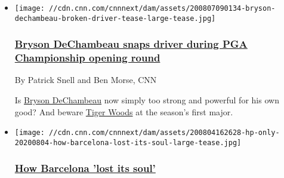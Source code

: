 \begin{itemize}
\item
  \href{/2020/08/07/golf/pga-championship-first-round-recap-bryson-dechambeau-spt-intl/index.html}{}

  \texttt{[image: //cdn.cnn.com/cnnnext/dam/assets/200807090134-bryson-dechambeau-broken-driver-tease-large-tease.jpg]}

  \hypertarget{bryson-dechambeau-snaps-driver-during-pga-championship-opening-round--1}{%
  \subsubsection{\texorpdfstring{\href{/2020/08/07/golf/pga-championship-first-round-recap-bryson-dechambeau-spt-intl/index.html}{Bryson
  DeChambeau snaps driver during PGA Championship opening round
  }}{Bryson DeChambeau snaps driver during PGA Championship opening round }}\label{bryson-dechambeau-snaps-driver-during-pga-championship-opening-round--1}}

  By Patrick Snell and Ben Morse, CNN

  Is
  \href{https://edition.cnn.com/2020/08/06/golf/bryson-dechambeau-calorie-trainer-bulking-muscle-golf-spt-intl/index.html}{Bryson
  DeChambeau} now simply too strong and powerful for his own good? And
  beware
  \href{https://edition.cnn.com/2020/08/05/golf/tiger-woods-pga-championship-golf-spt-intl/index.html}{Tiger
  Woods} at the season's first major.
\end{itemize}

\begin{itemize}
\item
  \href{/2020/08/07/football/barcelona-napoli-champions-league-lionel-messi-spt-intl-cmd/index.html}{}

  \texttt{[image: //cdn.cnn.com/cnnnext/dam/assets/200804162628-hp-only-20200804-how-barcelona-lost-its-soul-large-tease.jpg]}

  \hypertarget{how-barcelona-lost-its-soul-1}{%
  \subsubsection{\texorpdfstring{\href{/2020/08/07/football/barcelona-napoli-champions-league-lionel-messi-spt-intl-cmd/index.html}{How
  Barcelona 'lost its
  soul'}}{How Barcelona 'lost its soul'}}\label{how-barcelona-lost-its-soul-1}}
\end{itemize}

